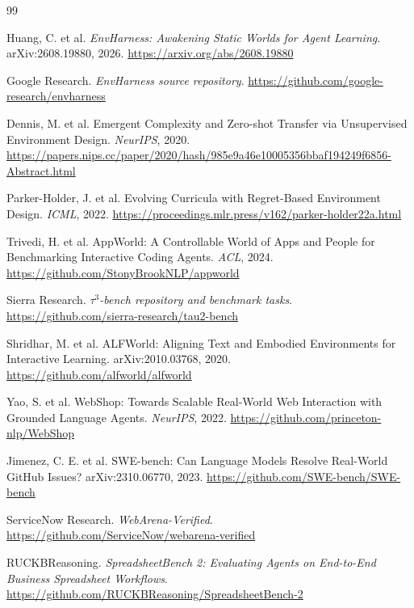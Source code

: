 \documentclass[11pt,a4paper,fontset=fandol]{ctexart}
\begin{document}
\begin{thebibliography}{99}

Huang, C. et al.
\newblock \emph{EnvHarness: Awakening Static Worlds for Agent Learning}.
\newblock arXiv:2608.19880, 2026.
\newblock \url{https://arxiv.org/abs/2608.19880}

Google Research.
\newblock \emph{EnvHarness source repository}.
\newblock \url{https://github.com/google-research/envharness}

Dennis, M. et al.
\newblock Emergent Complexity and Zero-shot Transfer via Unsupervised Environment Design.
\newblock \emph{NeurIPS}, 2020.
\newblock \url{https://papers.nips.cc/paper/2020/hash/985e9a46e10005356bbaf194249f6856-Abstract.html}

Parker-Holder, J. et al.
\newblock Evolving Curricula with Regret-Based Environment Design.
\newblock \emph{ICML}, 2022.
\newblock \url{https://proceedings.mlr.press/v162/parker-holder22a.html}

Trivedi, H. et al.
\newblock AppWorld: A Controllable World of Apps and People for Benchmarking Interactive Coding Agents.
\newblock \emph{ACL}, 2024.
\newblock \url{https://github.com/StonyBrookNLP/appworld}

Sierra Research.
\newblock \emph{$\tau^3$-bench repository and benchmark tasks}.
\newblock \url{https://github.com/sierra-research/tau2-bench}

Shridhar, M. et al.
\newblock ALFWorld: Aligning Text and Embodied Environments for Interactive Learning.
\newblock arXiv:2010.03768, 2020.
\newblock \url{https://github.com/alfworld/alfworld}

Yao, S. et al.
\newblock WebShop: Towards Scalable Real-World Web Interaction with Grounded Language Agents.
\newblock \emph{NeurIPS}, 2022.
\newblock \url{https://github.com/princeton-nlp/WebShop}

Jimenez, C. E. et al.
\newblock SWE-bench: Can Language Models Resolve Real-World GitHub Issues?
\newblock arXiv:2310.06770, 2023.
\newblock \url{https://github.com/SWE-bench/SWE-bench}

ServiceNow Research.
\newblock \emph{WebArena-Verified}.
\newblock \url{https://github.com/ServiceNow/webarena-verified}

RUCKBReasoning.
\newblock \emph{SpreadsheetBench 2: Evaluating Agents on End-to-End Business Spreadsheet Workflows}.
\newblock \url{https://github.com/RUCKBReasoning/SpreadsheetBench-2}

\end{thebibliography}
\end{document}
